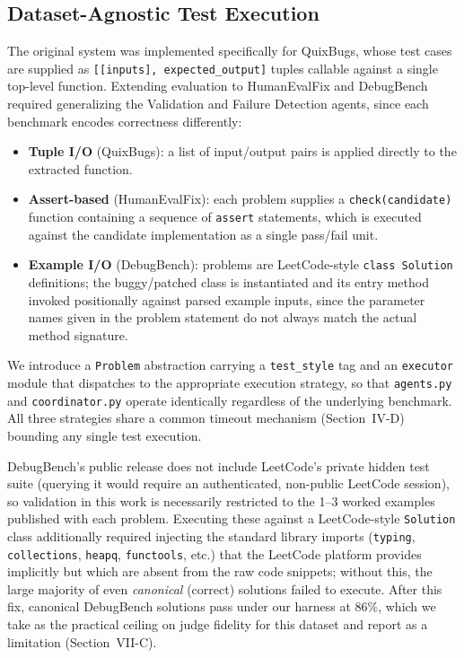 \documentclass[conference]{IEEEtran}
\begin{document}
\subsection{Dataset-Agnostic Test Execution}
\label{sec:dataset-agnostic}
The original system was implemented specifically for QuixBugs, whose test cases are supplied as \texttt{[[inputs], expected\_output]} tuples callable against a single top-level function. Extending evaluation to HumanEvalFix and DebugBench required generalizing the Validation and Failure Detection agents, since each benchmark encodes correctness differently:
\begin{itemize}
    \item \textbf{Tuple I/O} (QuixBugs): a list of input/output pairs is applied directly to the extracted function.
    \item \textbf{Assert-based} (HumanEvalFix): each problem supplies a \texttt{check(candidate)} function containing a sequence of \texttt{assert} statements, which is executed against the candidate implementation as a single pass/fail unit.
    \item \textbf{Example I/O} (DebugBench): problems are LeetCode-style \texttt{class Solution} definitions; the buggy/patched class is instantiated and its entry method invoked positionally against parsed example inputs, since the parameter names given in the problem statement do not always match the actual method signature.
\end{itemize}
We introduce a \texttt{Problem} abstraction carrying a \texttt{test\_style} tag and an \texttt{executor} module that dispatches to the appropriate execution strategy, so that \texttt{agents.py} and \texttt{coordinator.py} operate identically regardless of the underlying benchmark. All three strategies share a common timeout mechanism (Section~IV-D) bounding any single test execution.

DebugBench's public release does not include LeetCode's private hidden test suite (querying it would require an authenticated, non-public LeetCode session), so validation in this work is necessarily restricted to the 1--3 worked examples published with each problem. Executing these against a LeetCode-style \texttt{Solution} class additionally required injecting the standard library imports (\texttt{typing}, \texttt{collections}, \texttt{heapq}, \texttt{functools}, etc.) that the LeetCode platform provides implicitly but which are absent from the raw code snippets; without this, the large majority of even \emph{canonical} (correct) solutions failed to execute. After this fix, canonical DebugBench solutions pass under our harness at 86\%, which we take as the practical ceiling on judge fidelity for this dataset and report as a limitation (Section~VII-C).
\end{document}
